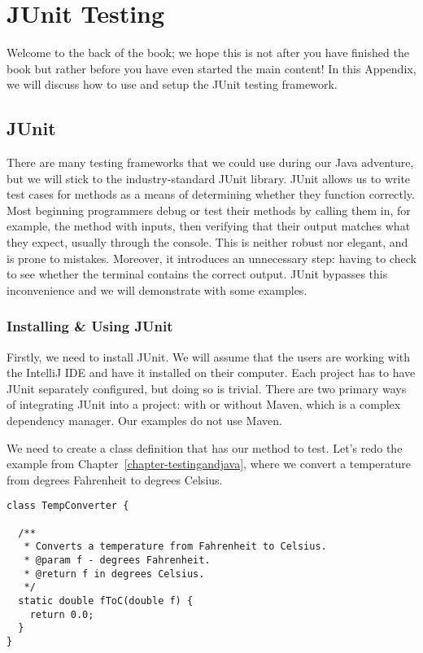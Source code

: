 \appendix
\chapter{JUnit Testing}
\label{appendix-junit} %

Welcome to the back of the book; we hope this is not after you have finished the book but rather before you have even started the main content! 
In this Appendix, we will discuss how to use and setup the JUnit testing framework.

\section{JUnit}

There are many testing frameworks that we could use during our Java adventure, but we will stick to the industry-standard JUnit library. 
JUnit allows us to write test cases for methods as a means of determining whether they function correctly. 
Most beginning programmers debug or test their methods by calling them in, for example, the  method with inputs, then verifying that their output matches what they expect, usually through the console. 
This is neither robust nor elegant, and is prone to mistakes. 
Moreover, it introduces an unnecessary step: having to check to see whether the terminal contains the correct output.
JUnit bypasses this inconvenience and we will demonstrate with some examples.

\subsection{Installing \& Using JUnit}

Firstly, we need to install JUnit. 
We will assume that the users are working with the IntelliJ IDE and have it installed on their computer. 
Each project has to have JUnit separately configured, but doing so is trivial. 
There are two primary ways of integrating JUnit into a project: with or without Maven, which is a complex dependency manager. 
Our examples do not use Maven.

We need to create a class definition that has our method to test. 
Let's redo the example from Chapter~\ref{chapter-testingandjava}, where we convert a temperature from degrees Fahrenheit to degrees Celsius.

\begin{lstlisting}[language=MyJava]
class TempConverter {

  /**
   * Converts a temperature from Fahrenheit to Celsius.
   * @param f - degrees Fahrenheit.
   * @return f in degrees Celsius.
   */
  static double fToC(double f) {
    return 0.0;
  }
}
\end{lstlisting}


